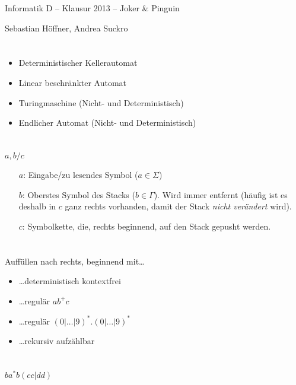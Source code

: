 \documentclass{article}
\begin{document}
\begin{center}
  \Large{Informatik D -- Klausur 2013 -- Joker \& Pinguin}

  \large{Sebastian Höffner, Andrea Suckro}
\end{center}

\section{}%
\begin{itemize}
	\item Deterministischer Kellerautomat
  \item Linear beschränkter Automat
  \item Turingmaschine (Nicht- und Deterministisch)
  \item Endlicher Automat (Nicht- und Deterministisch)
\end{itemize}

\section{}%
$a,b/c$
\begin{enumerate}
	\item[$a$:] Eingabe/zu lesendes Symbol ($a \in \Sigma$)
  \item[$b$:] Oberstes Symbol des Stacks ($b \in \Gamma$). Wird immer entfernt (häufig ist es deshalb in $c$ ganz rechts vorhanden, damit der Stack \emph{nicht verändert} wird).
  \item[$c$:] Symbolkette, die, rechts beginnend, auf den Stack gepusht werden.
\end{enumerate}

\section{}%
Auffüllen nach rechts, beginnend mit\dots
\begin{itemize}
	\item \dots deterministisch kontextfrei
	\item \dots regulär $ab^+c$
	\item \dots regulär $(0|\dots|9)^*.(0|\dots|9)^*$
	\item \dots rekursiv aufzählbar
\end{itemize}

\section{}%
$ba^*b(cc|dd)$
\end{document}
